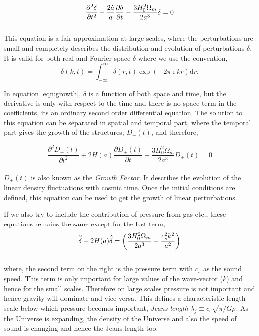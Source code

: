\begin{equation}
\centering
\dfrac{\partial^2 {\delta}}{\partial t^2} + \dfrac{2\dot{a}}{a} 
		\dfrac{\partial {\delta}}{\partial t}
		- \dfrac{3H_0^2 \Omega_m}{2a^3} {\delta} = 0
		\label{eqn:growth}
\end{equation}
\\
This equation is a fair approximation at large scales, where the perturbations
are small and completely describes the distribution and evolution of perturbations $\delta$. 
It is valid for both real and Fourier space $\tilde{\delta}$ where we use the convention,
\begin{equation}
	\tilde{\delta}(k,t) = \int_{-\infty}^{\infty} \delta(r,t) \exp(-2\pi \imath kr) \mathrm{d}r.
\end{equation}

In equation \ref{eqn:growth}, $\delta$ is a function of both space
and time, but the derivative is only with respect to the time and there is 
no space term in the coefficients, its an ordinary second order differential equation.
The solution to this equation can be 
separated in spatial and temporal part, where the temporal part gives the 
growth of the structures, $D_+(t)$, and therefore,

\begin{equation}
	\dfrac{\partial^2 D_+(t)}{\partial t^2} + 2 H(a)
		\dfrac{\partial D_+(t)}{\partial t}
		- \dfrac{3H_0^2 \Omega_m}{2a^3} D_+(t) = 0
		\label{eqn:growthfactor}
\end{equation}
\\
$D_+(t)$ is also known as the {\it Growth Factor}. It describes the evolution of the
linear density fluctuations with cosmic time. Once the initial conditions
are defined, this equation can be used to get the growth of linear perturbations. 

If we also try to include the contribution of pressure from gas etc., these equations remains
the same except for the last term,
\begin{equation}
\centering
	\ddot{\tilde{\delta}} + 2H(a) \dot{\tilde{\delta}} = 
					\left( \dfrac{3H_0^2\Omega_m}{2a^3} - \dfrac{c_s^2k^2}{a^2}   \right)
\end{equation}
\\
where, the second term on the right is the pressure term with $c_s$ as the sound speed. 
This term is only important
for large values of the wave-vector ($k$) and hence for the small scales. Therefore on 
large scales pressure is not important and hence gravity will dominate and vice-versa. 
This defines a characteristic length scale below which pressure becomes important, 
{\it Jeans length} $\lambda_j \equiv c_s \sqrt{\pi/G\rho}$. As the Universe is 
expanding, the density of the Universe and also the speed of sound is changing 
and hence the Jeans length too.

